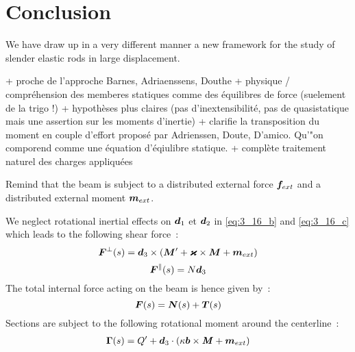 \section{Conclusion}
We have draw up in a very different manner a new framework for the study of slender elastic rods in large displacement.

+ proche de l'approche Barnes, Adriaenssens, Douthe
+ physique / compréhension des memberes statiques comme des équilibres de force (suelement de la trigo !)
+ hypothèses plus claires (pas d'inextensibilité, pas de quasistatique mais une assertion sur les moments d'inertie)
+ clarifie la transposition du moment en couple d'effort proposé par Adrienssen, Doute, D'amico. Qu'"on comporend comme une équation d'éqiulibre statique.
+ complète traitement naturel des charges appliquées



Remind that the beam is subject to a distributed external force $\boldsymbol{f}_{ext}$ and a distributed external moment $\boldsymbol{m}_{ext}$.

We neglect rotational inertial effects on $\boldsymbol{d}_1$ et $\boldsymbol{d}_2$ in \eqref{eq:3_16_b} and \eqref{eq:3_16_c} which leads to the following shear force~:
\begin{equation}
	\boldsymbol{F}^{\perp}(s) = \boldsymbol{d}_3 \times (\boldsymbol{M}' + \boldsymbol{\varkappa} \times \boldsymbol{M} + \boldsymbol{m}_{ext})
\end{equation}
\begin{equation}
	\boldsymbol{F}^{\parallel}(s) = N \boldsymbol{d}_3
\end{equation}
 The total internal force acting on the beam is hence given by~:
\begin{equation}
	\boldsymbol{F}(s) = \boldsymbol{N}(s) + \boldsymbol{T}(s)
\end{equation}
Sections are subject to the following rotational moment around the centerline~:
\begin{equation}
	\begin{aligned}
	\boldsymbol{\Gamma}(s) = Q' + \boldsymbol{d}_3 \cdot ( \kappa\boldsymbol{b} \times \boldsymbol{\mathit{M}} + \boldsymbol{m}_{ext})
	\end{aligned}
\end{equation}

